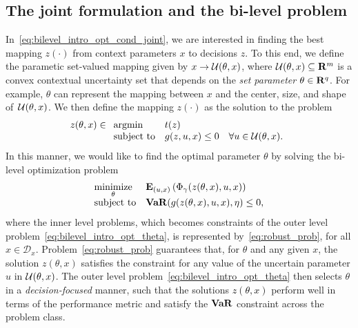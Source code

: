 \documentclass[11pt]{article}
\newcommand{\RC}[1]{\textcolor{black}{#1}}
\begin{document}
\subsection{The joint formulation and the bi-level problem}
\label{sec:joint}
In~\eqref{eq:bilevel_intro_opt_cond_joint}, we are interested in finding the best mapping $z(\cdot)$ from context parameters $x$ to decisions $z$. To this end, we define the parametic set-valued mapping given by $x \rightarrow {\mathcal{U}}(\theta,x)$, where 
${\mathcal{U}}(\theta,x) \subseteq {\mathbf R}^m$ is a convex contextual uncertainty set that depends on the {\it set parameter} $\theta \in {\mathbf R}^q$.
For example, $\theta$ can represent the mapping between $x$ and the center, size, and shape of~${\mathcal{U}}(\theta,x)$.
We then define the mapping $z(\cdot)$ as the solution to the  problem
\begin{equation}
	\label{eq:robust_prob}
	z(\theta, x) \in \begin{array}[t]{ll}
		\mbox{argmin}  &t(z)\\
		\mbox{subject to} & g(z,u,x)  \le 0  \quad \forall u \in {\mathcal{U}}(\theta,x).
	\end{array}
\end{equation}
In this manner, we would like to find the optimal parameter $\theta$ by solving the bi-level optimization problem
\begin{equation}
	\label{eq:bilevel_intro_opt_theta}
	\begin{array}{ll}
		\underset{\theta}{\mbox{minimize}} & \mathbf{E}_{(u,x)}\left(\Phi_\gamma(z(\theta,x),u,x)\right) \\
		\mbox{subject to} & \mathop{\bf VaR}(g(z(\theta,x),u,x),\eta) \leq 0,\\
	\end{array}
\end{equation}
where the inner level problems, which becomes constraints of the outer level problem~\eqref{eq:bilevel_intro_opt_theta}, is represented by~\eqref{eq:robust_prob}, for all $x \in \mathcal{D}_x$. 
Problem~\eqref{eq:robust_prob} guarantees that, for $\theta$ and any given $x$, the solution $z(\theta, x)$ satisfies the constraint for any value of the uncertain parameter $u$ in ${\mathcal{U}}(\theta,x)$. The outer level problem~\eqref{eq:bilevel_intro_opt_theta} then selects $\theta$ in a {\it decision-focused} manner, such that the solutions \RC{$z(\theta, x)$} perform well in terms of the performance metric and satisfy the $\mathop{\bf VaR}$ constraint across the problem class.
\end{document}
